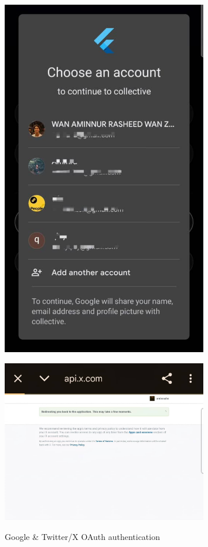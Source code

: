 \begin{figure}[H]
\centering
\begin{minipage}{0.4\textwidth}
\centering
\includegraphics[width=0.8\textwidth]{files/imgs/prototype/google_oauth.jpeg}
\caption{Google & Twitter/X OAuth authentication}
\label{fig:google-oauth}
\end{minipage}
\hfill
\begin{minipage}{0.4\textwidth}
\centering
\includegraphics[width=0.8\textwidth]{files/imgs/prototype/x_oauth.jpeg}
\label{fig:twitter-oauth}
\end{minipage}
\end{figure}


